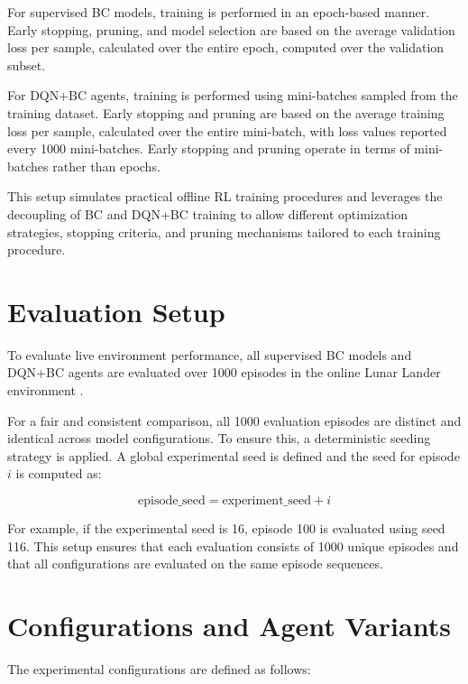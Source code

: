 For supervised BC models, training is performed in an epoch-based manner. Early stopping, pruning, and model selection are based on the average validation loss per sample, calculated over the entire epoch, computed over the validation subset.

For DQN+BC agents, training is performed using mini-batches sampled from the training dataset. Early stopping and pruning are based on the average training loss per sample, calculated over the entire mini-batch, with loss values reported every 1000 mini-batches. Early stopping and pruning operate in terms of mini-batches rather than epochs.

This setup simulates practical offline RL training procedures and leverages the decoupling of BC and DQN+BC training to allow different optimization strategies, stopping criteria, and pruning mechanisms tailored to each training procedure.





\section{Evaluation Setup}
\label{sec:evaluation_setup}

To evaluate live environment performance, all supervised BC models and DQN+BC agents are evaluated over 1000 episodes in the online Lunar Lander environment \cite{LunarLanderEnv}.

For a fair and consistent comparison, all 1000 evaluation episodes are distinct and identical across model configurations. To ensure this, a deterministic seeding strategy is applied. A global experimental seed is defined and the seed for episode $i$ is computed as:

$$\text{episode\_seed} = \text{experiment\_seed} + i$$

For example, if the experimental seed is 16, episode 100 is evaluated using seed 116. This setup ensures that each evaluation consists of 1000 unique episodes and that all configurations are evaluated on the same episode sequences.



\section{Configurations and Agent Variants}
\label{sec:configurations_and_agent_variants}

The experimental configurations are defined as follows:

